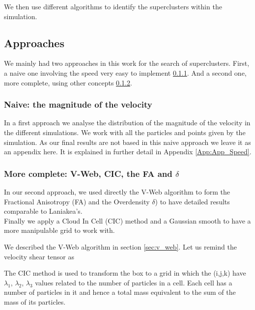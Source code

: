 \documentclass[12pt]{article}
\begin{document}
We then use different algorithms to identify the
 superclusters within the simulation.\\

\subsection{Approaches} \label{sec:approaches}
We mainly had two approaches in this work for the
 search of superclusters. First, a naive one
  involving the speed very easy to implement
   \ref{sec:naive_speed}. And a second one, more
    complete, using other concepts
     \ref{sec:approach_complete}.
\subsubsection{Naive: the magnitude of the velocity}
\label{sec:naive_speed}
\begin{par}
In a first approach we analyse the distribution of
 the magnitude of the velocity in the different
  simulations. We work with all the particles and
   points given by the simulation. As our final
    results are not based in this naive approach
     we leave it as an appendix here. It is
      explained in further detail in Appendix
       \ref{App:App_Speed}.
\end{par}

\subsubsection{More complete: V-Web, CIC, the FA and $\delta$}
\label{sec:approach_complete}
\begin{par}
In our second approach, we used directly the V-Web
 algorithm to form the Fractional Anisotropy (FA)
  and the Overdensity $\delta$) to have detailed
   results comparable to Laniakea's.\\
Finally we apply a Cloud In Cell (CIC) method and
 a Gaussian smooth to have a more manipulable grid
  to work with.\\
\end{par}


\begin{par}
We described the V-Web algorithm in section
 \ref{sec:v_web}. Let us remind the velocity shear
  tensor as 
\end{par}

\begin{par}
The CIC method is used to transform the box to a
 grid in which the (i,j,k) have {$\lambda_1$,
  $\lambda_2$, $\lambda_3$} values related to the
   number of particles in a cell.
Each cell has a number of particles in it and
 hence a total mass equivalent to the sum of the
  mass of its particles.
\end{par}
\end{document}
